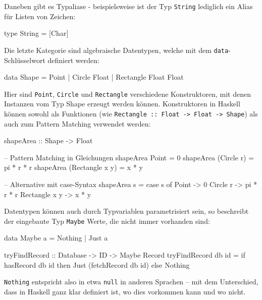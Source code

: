 \documentclass[12pt, a4paper, bibgerm]{scrbook}
\newenvironment{DIFnomarkup}{}{}
\newcommand\icode[1]{\lstinline?#1?}
\begin{document}
Daneben gibt es Typaliase - beispielsweise ist der Typ \icode{String}
lediglich ein Alias für Listen von Zeichen:
\begin{DIFnomarkup}\begin{code}
type String = [Char]
\end{code}\end{DIFnomarkup}

Die letzte Kategorie sind algebraische Datentypen, welche mit dem
\icode{data}-Schlüsselwort definiert werden:
\begin{DIFnomarkup}\begin{code}
data Shape = Point
           | Circle Float
           | Rectangle Float Float
\end{code}\end{DIFnomarkup}
Hier sind \icode{Point}, \icode{Circle} und \icode{Rectangle}
verschiedene Konstruktoren, mit denen Instanzen vom Typ Shape erzeugt
werden können. Konstruktoren in Haskell können sowohl als Funktionen
(wie \icode{Rectangle :: Float -> Float -> Shape}) als auch zum Pattern
Matching verwendet werden:
\begin{DIFnomarkup}\begin{code}
shapeArea :: Shape -> Float

-- Pattern Matching in Gleichungen
shapeArea Point           = 0
shapeArea (Circle r)      = pi * r * r
shapeArea (Rectangle x y) = x * y

-- Alternative mit case-Syntax
shapeArea s = case s of
                Point         -> 0
                Circle r      -> pi * r * r
                Rectangle x y -> x * y
\end{code}\end{DIFnomarkup}

Datentypen können auch durch Typvariablen parametrisiert sein, so
beschreibt der eingebaute Typ \icode{Maybe} Werte, die nicht immer
vorhanden sind:
\begin{DIFnomarkup}\begin{code}
data Maybe a = Nothing | Just a

tryFindRecord :: Database -> ID -> Maybe Record
tryFindRecord db id = if hasRecord db id
                      then
                        Just (fetchRecord db id)
                      else
                        Nothing
\end{code}\end{DIFnomarkup}
\icode{Nothing} entspricht also in etwa \icode{null} in anderen Sprachen
-- mit dem Unterschied, dass in Haskell ganz klar definiert ist, wo dies
vorkommen kann und wo nicht.
\end{document}
